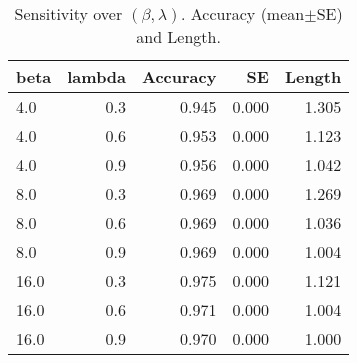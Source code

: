 \begin{table}[!htbp]
\centering
\small
\caption{Sensitivity over $(\beta,\lambda)$. Accuracy (mean$\pm$SE) and Length.}
\label{tab:sensitivity}
\begin{tabular}{lrrrr}
\toprule
beta & lambda & Accuracy & SE & Length \\
\midrule
4.0 & 0.3 & 0.945 & 0.000 & 1.305 \\
4.0 & 0.6 & 0.953 & 0.000 & 1.123 \\
4.0 & 0.9 & 0.956 & 0.000 & 1.042 \\
8.0 & 0.3 & 0.969 & 0.000 & 1.269 \\
8.0 & 0.6 & 0.969 & 0.000 & 1.036 \\
8.0 & 0.9 & 0.969 & 0.000 & 1.004 \\
16.0 & 0.3 & 0.975 & 0.000 & 1.121 \\
16.0 & 0.6 & 0.971 & 0.000 & 1.004 \\
16.0 & 0.9 & 0.970 & 0.000 & 1.000 \\
\bottomrule
\end{tabular}
\end{table}